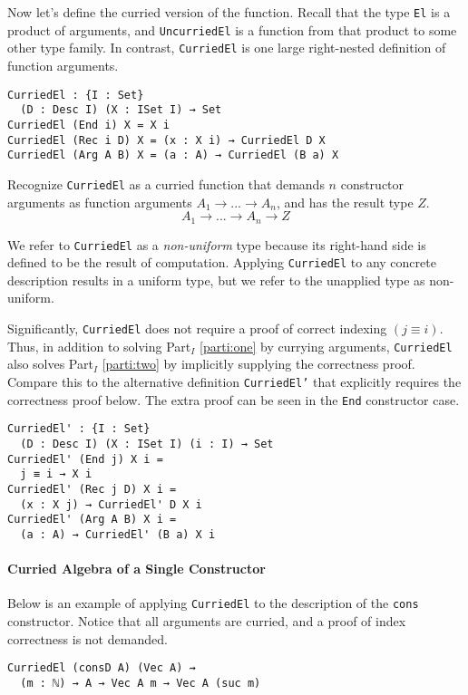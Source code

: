 \documentclass[preprint,nonatbib]{sigplanconf}
\newcommand{\refparti}[1]{Part$_I$ \ref{parti:#1}}
\begin{document}
Now let's define the curried version of the function. Recall that the
type {\tt El} is a product of arguments, and {\tt UncurriedEl} is a
function from that product to some other type family. In contrast,
{\tt CurriedEl} is one large right-nested definition of function
arguments.

\begin{verbatim}
CurriedEl : {I : Set}
  (D : Desc I) (X : ISet I) → Set
CurriedEl (End i) X = X i
CurriedEl (Rec i D) X = (x : X i) → CurriedEl D X
CurriedEl (Arg A B) X = (a : A) → CurriedEl (B a) X
\end{verbatim}

Recognize {\tt CurriedEl} as a curried function that demands
$n$ constructor arguments as function arguments
$A_1 → ... → A_n$, and has the result type $Z$.
\[
A_1 → ... → A_n → Z
\]

We refer to {\tt CurriedEl} as a {\it non-uniform} type because its
right-hand side is defined to be the result of computation.
Applying {\tt CurriedEl} to any concrete description results in a
uniform type, but we refer to the unapplied type as non-uniform.

Significantly, {\tt CurriedEl} does not require a proof of correct
indexing $(j≡i)$. Thus, in addition to solving \refparti{one} by
currying arguments, {\tt CurriedEl} also solves \refparti{two} by
implicitly supplying the correctness proof. Compare this to the
alternative definition {\tt CurriedEl'} that explicitly requires the
correctness proof below. The extra proof can be seen in the
{\tt End} constructor case.

\begin{verbatim}
CurriedEl' : {I : Set}
  (D : Desc I) (X : ISet I) (i : I) → Set
CurriedEl' (End j) X i =
  j ≡ i → X i
CurriedEl' (Rec j D) X i =
  (x : X j) → CurriedEl' D X i
CurriedEl' (Arg A B) X i =
  (a : A) → CurriedEl' (B a) X i
\end{verbatim}

\paragraph{Curried Algebra of a Single Constructor}

Below is an example of applying {\tt CurriedEl} to the
description of the {\tt cons} constructor. Notice that all arguments
are curried, and a proof of index correctness is not demanded.

\begin{verbatim}
CurriedEl (consD A) (Vec A) ⇝
  (m : ℕ) → A → Vec A m → Vec A (suc m)
\end{verbatim}
\end{document}
